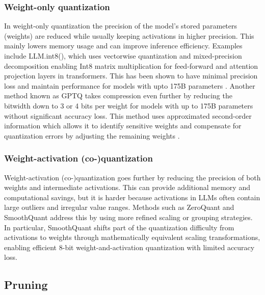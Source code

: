 \subsubsection{Weight-only quantization}\label{weight-only-quantization}

In weight-only quantization the precision of the model’s stored parameters (weights) are reduced while usually keeping activations in higher precision. This mainly lowers memory usage and can improve inference efficiency. Examples include LLM.int8(), which uses vectorwise quantization and mixed-precision decomposition enabling Int8 matrix multiplication for feed-forward and attention projection layers in transformers. This has been shown to have minimal precision loss and maintain performance for models with upto 175B parameters \cite{dettmers2022llm}. Another method known as GPTQ takes compression even further by reducing the bitwidth down to 3 or 4 bits per weight for models with up to 175B parameters without significant accuracy loss. This method uses approximated second-order information which allows it to identify sensitive weights and compensate for quantization errors by adjusting the remaining weights \cite{frantar2023gptq}.

\subsubsection{Weight-activation (co-)quantization}\label{weight-activation-quantization}

Weight-activation (co-)quantization goes further by reducing the precision of both weights and intermediate activations. This can provide additional memory and computational savings, but it is harder because activations in LLMs often contain large outliers and irregular value ranges. Methods such as ZeroQuant and SmoothQuant address this by using more refined scaling or grouping strategies. In particular, SmoothQuant shifts part of the quantization difficulty from activations to weights through mathematically equivalent scaling transformations, enabling efficient 8-bit weight-and-activation quantization with limited accuracy loss.  \cite{yue2024reviewonedge}



\subsection{Pruning}\label{sec:pruning}

